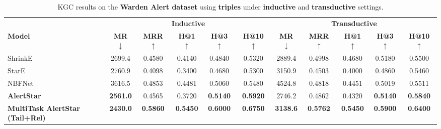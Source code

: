 \documentclass[10pt,journal,compsoc]{IEEEtran}
\begin{document}

\begin{table}[t]
\tiny
\centering
\caption{KGC results on the \textbf{Warden Alert dataset} 
         using \textbf{triples} under \textbf{inductive} and \textbf{transductive} settings.}
\label{tab:kgc_triples_warden}
\begin{tabular}{l ccccc ccccc}
\toprule
 & \multicolumn{5}{c}{\textbf{Inductive}} & \multicolumn{5}{c}{\textbf{Transductive}} \\
\cmidrule(lr){2-6} \cmidrule(lr){7-11}
\textbf{Model} & \textbf{MR} $\downarrow$ & \textbf{MRR} $\uparrow$& \textbf{H@1} $\uparrow$& \textbf{H@3} $\uparrow$& \textbf{H@10} $\uparrow$& \textbf{MR} $\downarrow$& \textbf{MRR} $\uparrow$& \textbf{H@1} $\uparrow$& \textbf{H@3} $\uparrow$& \textbf{H@10} $\uparrow$\\
\midrule
ShrinkE         & 2699.4 & 0.4580 & 0.4140 & 0.4840 & 0.5320 & 2889.4 & 0.4998 & 0.4680 & 0.5180 & 0.5500 \\
StarE           & 2760.9 & 0.4098 & 0.3400 & 0.4680 & 0.5300 & 3150.9 & 0.4503 & 0.4000 & 0.4860 & 0.5460 \\
NBFNet          & 3616.5 & 0.4853 & 0.4481 & 0.5060 & 0.5480 & 4524.8 & 0.4818 & 0.4451 & 0.5019 & 0.5511 \\
\midrule
\textbf{AlertStar}       & \textbf{2561.0} & 0.4565 & 0.3720 & \textbf{0.5140} & \textbf{0.5920} & 2746.2 & 0.4862 & 0.4320 & \textbf{0.5140} & \textbf{0.5840} \\
\textbf{MultiTask AlertStar (Tail+Rel)} & \textbf{2430.0} & \textbf{0.5860} & \textbf{0.5450} & \textbf{0.6000} & \textbf{0.6750} & \textbf{3138.6} & \textbf{0.5762} & \textbf{0.5450} & \textbf{0.5900} & \textbf{0.6400} \\

\bottomrule
\end{tabular}
\end{table}
\end{document}
